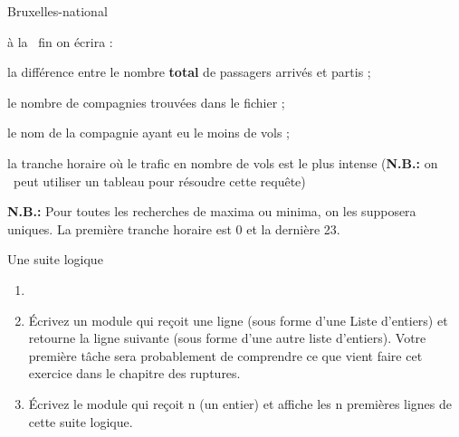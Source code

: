 \begin{Exercice}{Bruxelles-national}
	\bigskip

	\liststyleListv
	\begin{liste}
		\item 
			à la \ fin on écrira : 
		\item 
			la différence entre le nombre \textbf{total} de passagers arrivés et
			partis ;
		\item 
			le nombre de compagnies trouvées dans le fichier ;
		\item 
			le nom de la compagnie ayant eu le moins de vols ;
		\item 
			la tranche horaire où le trafic en nombre de vols est le plus intense
			(\textbf{N.B.:} on \ peut utiliser un tableau pour résoudre cette
			requête)
	\end{liste}
	
	\textbf{N.B.:} Pour toutes les recherches de maxima ou minima, on les
	supposera uniques. La première tranche horaire est 0 et la dernière 23.
\end{Exercice}

\begin{Exercice}{Une suite logique}

	\begin{enumerate}[label=\alph*)]
		\item 
			\begin{center}
			\begin{minipage}{4.748cm}
			{}

			{}

			{}

			{}

			{}

			{}

			{}

			{}

			{}

			{}
			\end{minipage}
			\end{center}
		\item 
			Écrivez un module qui reçoit une ligne (sous forme
			d'une Liste d'entiers) et retourne la
			ligne suivante (sous forme d'une autre liste
			d'entiers). Votre première tâche sera probablement de
			comprendre ce que vient faire cet exercice dans le chapitre des
			ruptures.
		\item 
			Écrivez le module qui reçoit n (un entier) 
			et affiche les n premières lignes de cette suite
			logique.
	\end{enumerate}
\end{Exercice}


